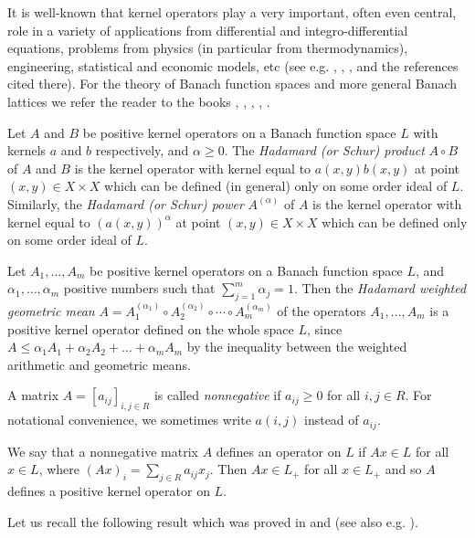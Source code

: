 \documentclass[12pt, reqno]{amsart}
\theoremstyle{definition}
\theoremstyle{remark}
\numberwithin{equation}{section}
\begin{document}
It is well-known that kernel operators play a very important, often even central, role in a variety of applications from differential and integro-differential equations, problems from physics
(in particular from thermodynamics), engineering, statistical and economic models, etc (see e.g. \cite{J82}, \cite{BP03}, \cite{LL05}, \cite{DLR13} %
and the references cited there).
For the theory of Banach function spaces and more general Banach lattices we refer the reader to the books \cite{Za83}, \cite{BS88}, \cite{AA02}, \cite{AB85}, \cite{Me91}.

Let $A$ and $B$ be positive kernel operators on a Banach function space $L$ with kernels $a$ and $b$ respectively,
and $\alpha \ge 0$.
The \textit{Hadamard (or Schur) product} $A \circ B$ of $A$ and $B$ is the kernel operator
with kernel equal to $a(x,y)b(x,y)$ at point $(x,y) \in X \times X$ which can be defined (in general)
only on some order ideal of $L$. Similarly, the \textit{Hadamard (or Schur) power}
$A^{(\alpha)}$ of $A$ is the kernel operator with kernel equal to $(a(x, y))^{\alpha}$
at point $(x,y) \in X \times X$ which can be defined only on some order ideal of $L$.

Let $A_1 ,\ldots, A_m$ be positive kernel operators on a Banach function space $L$,
and $\alpha _1, \ldots, \alpha _m$ positive numbers such that $\sum_{j=1}^m \alpha _j = 1$.
Then the {\it  Hadamard weighted geometric mean}
$A = A_1 ^{( \alpha _1)} \circ A_2 ^{(\alpha _2)} \circ \cdots \circ A_m ^{(\alpha _m)}$ of
the operators $A_1 ,\ldots, A_m$ is a positive kernel operator defined
on the whole space $L$, since $A \le \alpha _1 A_1 + \alpha _2 A_2 + \ldots + \alpha _m A_m$ by the inequality between the weighted arithmetic and geometric means.

A matrix $A=[a_{ij}]_{i,j\in R}$ is called {\it nonnegative} if $a_{ij}\ge 0$ for all $i, j \in R$.
For notational convenience, we sometimes write $a(i,j)$ instead of $a_{ij}$.

We say that a nonnegative matrix $A$ defines an operator on $L$ if $Ax \in L$ for all $x\in L$, where
$(Ax)_i = \sum _{j \in R}a_{ij}x_j$. Then $Ax \in L_+$ for all $x\in L_+$ and
so $A$ defines a positive kernel operator on $L$.

 Let us recall  the following result which was proved in \cite[Theorem 2.2]{DP05} and
\cite[Theorem 5.1 and Example 3.7]{P06} (see also e.g. \cite[Theorem 2.1]{P17}).
\end{document}

